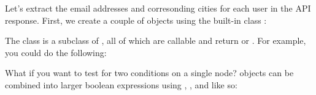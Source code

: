 \documentclass[letterpaper,10pt,english]{sphinxmanual}
\begin{document}
Let’s extract the email addresses and corresonding cities for each user in the API response. First, we create a couple of  objects using the built-in class :

%
\begin{sphinxVerbatim}[commandchars=\\\{\}]
  
  
\end{sphinxVerbatim}

The  class is a subclass of , all of which are callable and return  or . For example, you could do the following:

%
\begin{sphinxVerbatim}[commandchars=\\\{\}]
     
  
   
\end{sphinxVerbatim}

What if you want to test for two conditions on a single node?  objects can be combined into larger boolean expressions using \sphinxcode{\sphinxupquote{\&}}, \sphinxcode{\sphinxupquote{\textbar{}}}, and \sphinxcode{\sphinxupquote{\textasciitilde{}}} like so:

%
\begin{sphinxVerbatim}[commandchars=\\\{\}]
      
     
      
\end{sphinxVerbatim}
\end{document}
